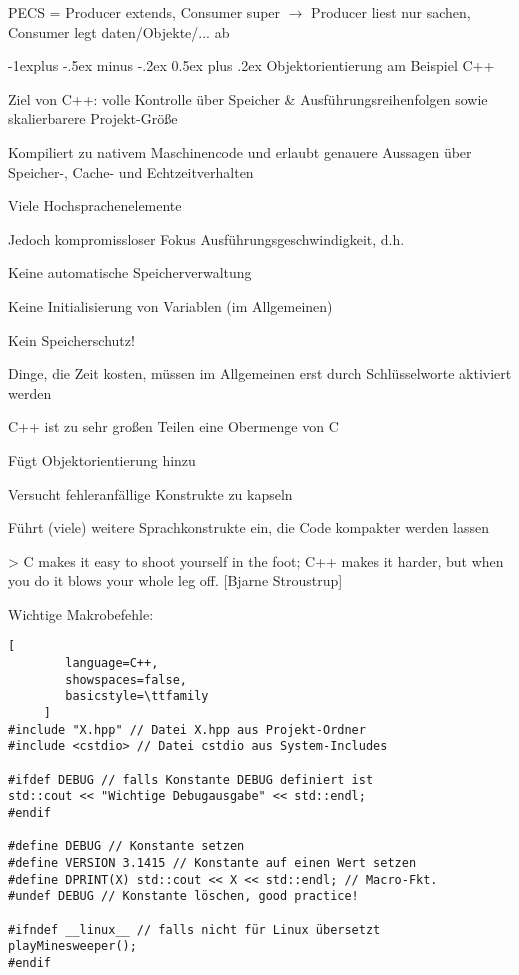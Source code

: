 \documentclass[10pt]{article}
\makeatletter
\renewcommand{\subsection}{\@startsection{subsection}{2}{0mm}%
                                {-1explus -.5ex minus -.2ex}%
                                {0.5ex plus .2ex}%
                                {\normalfont\normalsize\bfseries}}
\makeatother
\begin{document}
PECS = Producer extends, Consumer super $\rightarrow$ Producer liest nur sachen, Consumer legt daten/Objekte/... ab


\subsection{Objektorientierung am Beispiel C++}
\begin{itemize*}
  \item Ziel von C++: volle Kontrolle über Speicher \& Ausführungsreihenfolgen sowie skalierbarere Projekt-Größe
  \item Kompiliert zu nativem Maschinencode und erlaubt genauere Aussagen über Speicher-, Cache- und Echtzeitverhalten
  \item Viele Hochsprachenelemente
  \item Jedoch kompromissloser Fokus Ausführungsgeschwindigkeit, d.h.
  \begin{itemize*}
    \item Keine automatische Speicherverwaltung
    \item Keine Initialisierung von Variablen (im Allgemeinen)
    \item Kein Speicherschutz!
    \item Dinge, die Zeit kosten, müssen im Allgemeinen erst durch Schlüsselworte aktiviert werden
  \end{itemize*}
  \item C++ ist zu sehr großen Teilen eine Obermenge von C
  \begin{itemize*}
    \item Fügt Objektorientierung hinzu
    \item Versucht fehleranfällige Konstrukte zu kapseln
    \item Führt (viele) weitere Sprachkonstrukte ein, die Code kompakter werden lassen
  \end{itemize*}
\end{itemize*}

> C makes it easy to shoot yourself in the foot; C++ makes it harder, but when you do it blows your whole leg off. [Bjarne Stroustrup]


Wichtige Makrobefehle:
\begin{lstlisting}[
        language=C++,
        showspaces=false,
        basicstyle=\ttfamily
     ]
#include "X.hpp" // Datei X.hpp aus Projekt-Ordner
#include <cstdio> // Datei cstdio aus System-Includes

#ifdef DEBUG // falls Konstante DEBUG definiert ist
std::cout << "Wichtige Debugausgabe" << std::endl;
#endif

#define DEBUG // Konstante setzen
#define VERSION 3.1415 // Konstante auf einen Wert setzen
#define DPRINT(X) std::cout << X << std::endl; // Macro-Fkt.
#undef DEBUG // Konstante löschen, good practice!

#ifndef __linux__ // falls nicht für Linux übersetzt
playMinesweeper();
#endif
\end{lstlisting}
\end{document}
